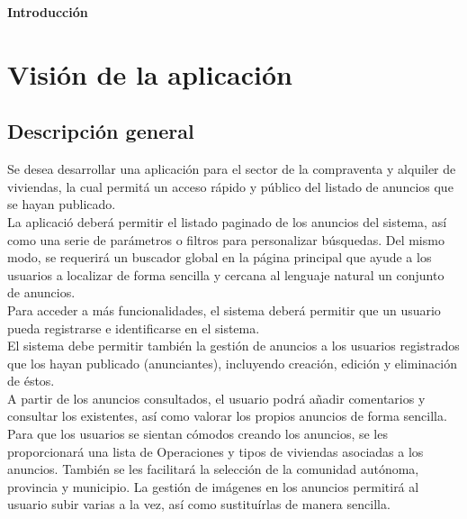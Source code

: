 \newpage{\pagestyle{empty}\cleardoublepage}
\newpage{\pagestyle{empty}\cleardoublepage}
\newpage
\vspace*{\fill}
    \begin{center}
      \thispagestyle{empty} \vspace*{0cm} \textbf{\huge
Introducci\'{o}n}
    \end{center}
    \vspace*{\fill}
\newpage{\pagestyle{empty}\cleardoublepage}
\chapter{Visi\'{o}n de la aplicaci\'{o}n}
\section{Descripci\'{o}n general}


Se desea desarrollar una aplicaci\'{o}n para el sector de la compraventa y alquiler de viviendas, la cual permit\'{a} un acceso r\'{a}pido y p\'{u}blico del listado de anuncios que se hayan publicado. \\

La aplicaci\'{o} deber\'{a} permitir el listado paginado de los anuncios del sistema, as\'{i} como una serie de par\'{a}metros o filtros para personalizar b\'{u}squedas. Del mismo modo, se requerir\'{a} un buscador global en la p\'{a}gina principal que ayude a los usuarios a localizar de forma sencilla y cercana al lenguaje natural un conjunto de anuncios.\\

Para acceder a m\'{a}s funcionalidades, el sistema deber\'{a} permitir que un usuario pueda registrarse e identificarse en el sistema.\\

El sistema debe permitir tambi\'{e}n la gesti\'{o}n de anuncios a los usuarios registrados que los hayan publicado (anunciantes), incluyendo creaci\'{o}n, edici\'{o}n y eliminaci\'{o}n de \'{e}stos.\\

A partir de los anuncios consultados, el usuario podr\'{a} a\~{n}adir comentarios y consultar los existentes, as\'{i} como valorar los propios anuncios de forma sencilla.\\

Para que los usuarios se sientan c\'{o}modos creando los anuncios, se les proporcionar\'{a} una lista de Operaciones y tipos de viviendas asociadas a los anuncios. Tambi\'{e}n se les facilitar\'{a} la selecci\'{o}n de la comunidad aut\'{o}noma, provincia y municipio. La gesti\'{o}n de im\'{a}genes en los anuncios permitir\'{a} al usuario subir varias a la vez, as\'{i} como sustitu\'{i}rlas de manera sencilla.\\

